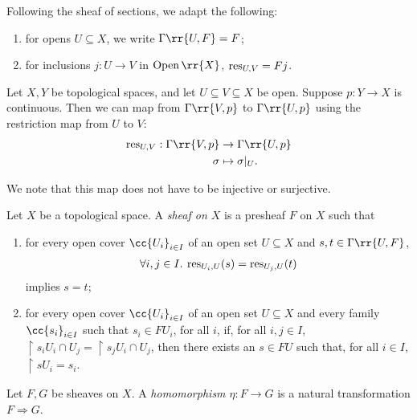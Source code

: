 \documentclass{article}
\begin{document}
\begin{notation}
  Following the sheaf of sections, we adapt the following:
  \begin{enumerate}
    \item for opens $U\subseteq X$, we write $\Gamma\rr{U,F}=F$;
    \item for inclusions $j:U\to V$ in $\Open\rr{X}$, $\operatorname{res}_{U,V}=Fj$.
  \end{enumerate}
\end{notation}

\begin{example}
Let $X, Y$ be topological spaces, and let $U \subseteq V \subseteq X$ be open. Suppose $p : Y \to X$ is continuous. Then we can map from $\Gamma\rr{V,p}$ to $\Gamma\rr{U,p}$ using the restriction map from $U$ to $V$:
\begin{align*}
	\res_{U,V} : \Gamma\rr{V,p} &\to \Gamma\rr{U,p}\\
	\sigma &\mapsto \sigma|_U.
\end{align*}
\end{example}

We note that this map does not have to be injective or surjective.

\begin{definition}
  Let $X$ be a topological space. A \emph{sheaf on $X$} is a presheaf $F$ on $X$
  such that
  \begin{enumerate}
    \item for every open cover $\cc{U_i}_{i\in I}$ of an open set $U\subseteq X$ and
      $s,t\in\Gamma\rr{U,F}$,
      \begin{align*}
        \forall i,j\in I.\: \operatorname{res}_{U_i,U}(s) = \operatorname{res}_{U_j,U}(t)
      \end{align*}
      implies $s=t$;
    \item for every open cover $\cc{U_i}_{i\in I}$ of an open set $U\subseteq X$
      and every family $\cc{s_i}_{i\in I}$ such that $s_i\in FU_i$, for all $i$,
      if, for all $i,j\in I$, $\restriction{s_i}{U_i\cap U_j} = \restriction{s_j}{U_i\cap U_j}$,
      then there exists an $s\in FU$ such that, for all $i\in I$,
      $\restriction{s}{U_i}=s_i$.
  \end{enumerate}
\end{definition}

\begin{definition}
  Let $F,G$ be sheaves on $X$. A \emph{homomorphism $\eta:F\to G$} is
  a natural transformation $F\Rightarrow G$.
\end{definition}
\end{document}

